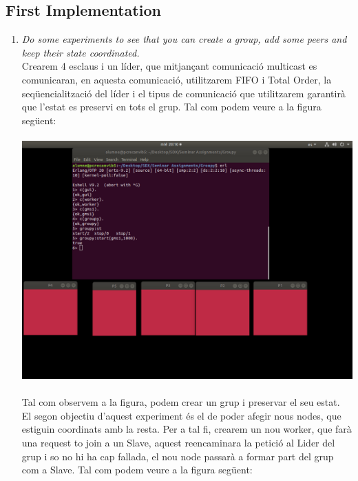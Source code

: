 \documentclass[a4paper, 10pt]{article}
\begin{document}
\subsection{First Implementation}
\begin{enumerate}
    \item\textit{Do some experiments to see that you can create a group, add some peers
    and keep their state coordinated.}\\
Crearem 4 esclaus i un líder, que mitjançant  comunicació multicast es comunicaran, en aquesta comunicació, utilitzarem FIFO i Total Order, la seqüencialització del líder i el tipus de comunicació que utilitzarem garantirà que l'estat es preservi en tots el grup. Tal com podem veure a la figura següent:\\\\
    \includegraphics[width=\textwidth]{img1.png}\\\\
    Tal com observem a la figura, podem crear un grup i preservar el seu estat.\\
\newpage El segon objectiu d'aquest experiment és el de poder afegir nous nodes, que estiguin coordinats amb la resta. Per a tal fi, crearem un nou worker, que farà una request to join a un Slave, aquest reencaminara la petició al Lider del grup i so no hi ha cap fallada, el nou node passarà a formar part del grup com a Slave. Tal com podem veure a la figura següent:\\\\

\end{enumerate}
\end{document}
